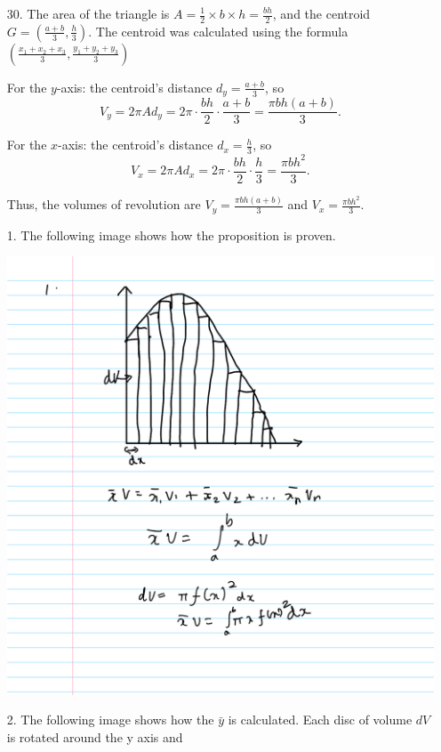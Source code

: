 \documentclass[12pt]{article}
\begin{document}
 
\begin{enumerate}[start=1,label={\bfseries. },leftmargin=1in]
\item [30. ]The area of the triangle is \( A = \frac{1}{2} \times b \times h = \frac{bh}{2} \), and the centroid \( G = \left( \frac{a+b}{3}, \frac{h}{3} \right) \). The centroid was calculated using the formula $\left(\frac{x_1 + x_2 + x_3}{3},\frac{y_1 + y_2 + y_3}{3}\right)$ 

For the \(y\)-axis: the centroid’s distance \( d_y = \frac{a+b}{3} \), so 
\[
V_y = 2 \pi A d_y = 2 \pi \cdot \frac{bh}{2} \cdot \frac{a+b}{3} = \frac{\pi bh (a+b)}{3}.
\]

For the \(x\)-axis: the centroid’s distance \( d_x = \frac{h}{3} \), so 
\[
V_x = 2 \pi A d_x = 2 \pi \cdot \frac{bh}{2} \cdot \frac{h}{3} = \frac{\pi bh^2}{3}.
\]

Thus, the volumes of revolution are \( V_y = \frac{\pi bh (a+b)}{3} \) and \( V_x = \frac{\pi bh^2}{3} \).

\item [1.]
The following image shows how the proposition is proven. 

    \includegraphics[width=0.75\linewidth]{Math 134//Images/Hw 7.jpeg}
\item [2. ]
The following image shows how the $\bar{y}$ is calculated. Each disc of volume $dV$is rotated around the y axis and


\end{enumerate}
\end{document}
